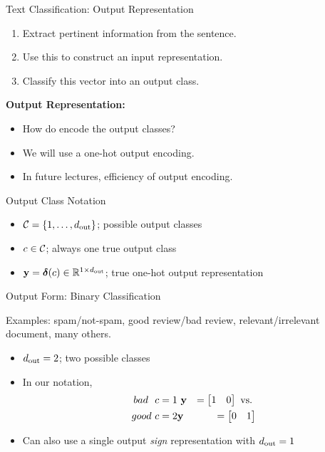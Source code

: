 \documentclass{beamer}
\begin{document}
\begin{frame}{Text Classification: Output Representation}
  \begin{enumerate}
  \item Extract pertinent information from the sentence. 
    \air 

  \item Use this to construct an input representation.
    \air

  \item Classify this vector into an output class.
  \end{enumerate}

  \air


  \textbf{Output Representation:}

  \begin{itemize}
  \item How do encode the output classes?
  \item We will use a one-hot output encoding.
  \item In future lectures, efficiency of output encoding.
  \end{itemize}
\end{frame}




\begin{frame}{Output Class Notation}
  \begin{itemize}
  \item $\mathcal{C} = \{1, \ldots, {d_{\mathrm{out}}}\}$; possible output classes
  \item $c \in \mathcal{C}$; always one true output class 
  \item $\mathbf{y} = \boldsymbol{\delta}(c) \in \mathbb{R}^{1\times {d_{\mathrm{out}}}}$; true one-hot output representation

  \end{itemize}
\end{frame}

\begin{frame}{Output Form: Binary Classification}

  Examples: spam/not-spam, good review/bad review, relevant/irrelevant document, many others.   
  \begin{itemize}
  \item ${d_{\mathrm{out}}} = 2$; two possible classes
  \item In our notation,
    \begin{eqnarray*} 
    bad \ \ c = 1 & \  \mathbf{y} &= \begin{bmatrix} 1 & 0  \end{bmatrix}  \mathrm {\ vs. \ } \\
    good \ c = 2 & \mathbf{y} &= \begin{bmatrix} 0  & 1  \end{bmatrix} 
   \end{eqnarray*} 
   \item Can also use a single output \textit{sign} representation with ${d_{\mathrm{out}}} = 1$ 
  \end{itemize}

\end{frame}
\end{document}
